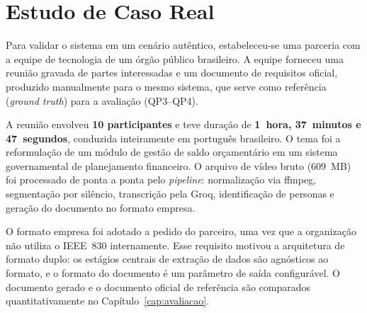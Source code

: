 \section{Estudo de Caso Real}
\label{sec:estudocaso}

Para validar o sistema em um cenário autêntico, estabeleceu-se uma parceria com a equipe de tecnologia de um órgão público brasileiro. A equipe forneceu uma reunião gravada de partes interessadas e um documento de requisitos oficial, produzido manualmente para o mesmo sistema, que serve como referência (\textit{ground truth}) para a avaliação (QP3--QP4).

A reunião envolveu \textbf{10 participantes} e teve duração de \textbf{1~hora, 37~minutos e 47~segundos}, conduzida inteiramente em português brasileiro. O tema foi a reformulação de um módulo de gestão de saldo orçamentário em um sistema governamental de planejamento financeiro. O arquivo de vídeo bruto (609~MB) foi processado de ponta a ponta pelo \textit{pipeline}: normalização via ffmpeg, segmentação por silêncio, transcrição pela Groq, identificação de personas e geração do documento no formato empresa.

O formato empresa foi adotado a pedido do parceiro, uma vez que a organização não utiliza o IEEE~830 internamente. Esse requisito motivou a arquitetura de formato duplo: os estágios centrais de extração de dados são agnósticos ao formato, e o formato do documento é um parâmetro de saída configurável. O documento gerado e o documento oficial de referência são comparados quantitativamente no Capítulo~\ref{cap:avaliacao}.
